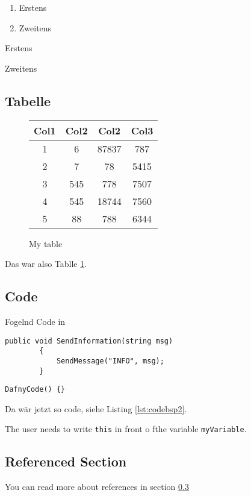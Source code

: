 \begin{enumerate}
    \item Erstens
    \item Zweitens
\end{enumerate}

\begin{description}
    \item Erstens
    \item Zweitens
\end{description}

\subsection{Tabelle}
\begin{figure}[!h]
    \centering
  \begin{tabular}{| c | c | c | c |}
    \hline
    Col1 & Col2 & Col2 & Col3 \\ [0.5ex]
    \hline\hline
    1 & 6 & 87837 & 787 \\
    \hline
    2 & 7 & 78 & 5415 \\
    \hline
    3 & 545 & 778 & 7507 \\
    \hline
    4 & 545 & 18744 & 7560 \\
    \hline
    5 & 88 & 788 & 6344 \\ [1ex]
    \hline
  \end{tabular}
  \label{tab:tabbsp}
  \caption{My table}
\end{figure}
Das war also Tablle \ref{tab:tabbsp}.

\subsection{Code}
Fogelnd Code in \Csharp
\lstset{style=sharpc}
\begin{lstlisting}[caption={My Caption}, captionpos=b, label={lst:codebsp}]
        public void SendInformation(string msg)
        {
            SendMessage("INFO", msg);
        }
\end{lstlisting}

\lstset{style=dafny}
\begin{lstlisting}[caption={My Caption}, captionpos=b, label={lst:codebsp2}]
        DafnyCode() {}
\end{lstlisting}
Da wär jetzt so code, siehe Listing \ref{lst:codebsp2}.

The user needs to write \texttt{this} in front o fthe variable \texttt{myVariable}.

\subsection{Referenced Section}
\label{section:my}
You can read more about references in section \ref{section:my}

